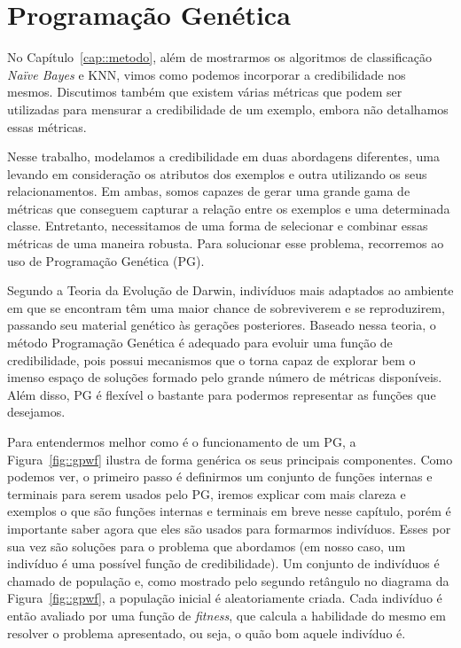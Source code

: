 
\section{Programação Genética}
\label{cap::gp}

No Capítulo~\ref{cap::metodo},
além de mostrarmos os algoritmos de classificação \textit{Naïve Bayes} e \textsc{KNN}, vimos como podemos incorporar a credibilidade nos mesmos.
Discutimos também que existem várias métricas que podem ser utilizadas para mensurar a credibilidade de um exemplo, 
embora não detalhamos essas métricas.

Nesse trabalho, modelamos a credibilidade em duas abordagens diferentes, uma levando em consideração os atributos dos exemplos e outra utilizando os seus relacionamentos. 
Em ambas, somos capazes de gerar uma grande gama de métricas que conseguem capturar a relação entre os exemplos e uma determinada classe.
Entretanto, necessitamos de uma forma de selecionar e combinar essas métricas de uma maneira robusta. Para solucionar esse problema, recorremos ao uso de Programação Genética (\textsc{PG}).

Segundo a Teoria da Evolução de Darwin, indivíduos mais adaptados ao ambiente em que se encontram têm uma maior chance de sobreviverem e se reproduzirem, passando seu material genético às gerações posteriores. Baseado nessa teoria, o método Programação Genética é adequado para evoluir uma função de credibilidade, pois possui mecanismos que o torna capaz de explorar bem o imenso espaço de soluções formado pelo grande número de métricas disponíveis. Além disso, \textsc{PG} é flexível o bastante para podermos representar as funções que desejamos.

Para entendermos melhor como é o funcionamento de um \textsc{PG}, a Figura~\ref{fig::gpwf} ilustra de forma genérica os seus principais componentes.
Como podemos ver, o primeiro passo é definirmos um conjunto de funções internas e terminais para serem usados pelo \textsc{PG}, iremos explicar com mais clareza e exemplos o que são funções internas e terminais em breve nesse capítulo, porém é importante saber agora que eles são usados para formarmos indivíduos. 
Esses por sua vez são soluções para o problema que abordamos (em nosso caso, um indivíduo é uma possível função de credibilidade).
Um conjunto de indivíduos é chamado de população e, como mostrado pelo segundo retângulo no diagrama da Figura~\ref{fig::gpwf}, a população inicial é aleatoriamente criada. 
Cada indivíduo é então avaliado por uma função de \textit{fitness}, que calcula a habilidade do mesmo em resolver o problema apresentado, ou seja, o quão bom aquele indivíduo é.


